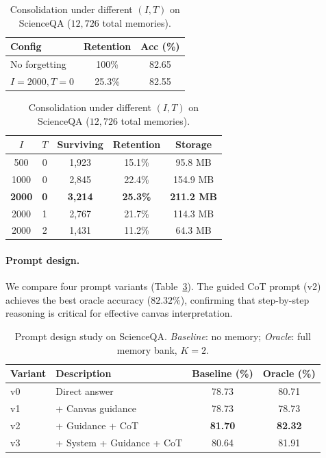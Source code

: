 \documentclass{article}
\begin{document}
\begin{table}[t]
  \centering
  \begin{minipage}[t]{0.38\textwidth}
    \centering
    \caption{Effect of memory consolidation on ScienceQA.}
    \label{tab:consolidation}
    \begin{tabular}{@{}lcc@{}}
      \toprule
      Config & Retention & Acc (\%) \\
      \midrule
      No forgetting & 100\% & 82.65 \\
      $I\!=\!2000, T\!=\!0$ & 25.3\% & 82.55 \\
      \bottomrule
    \end{tabular}
  \end{minipage}
  \hfill
  \begin{minipage}[t]{0.58\textwidth}
    \centering
    \caption{Consolidation under different $(I, T)$ on ScienceQA ($12{,}726$ total memories).}
    \label{tab:forgetting_configs}
    \begin{tabular}{@{}ccccc@{}}
      \toprule
      $I$ & $T$ & Surviving & Retention & Storage \\
      \midrule
      500 & 0 & 1,923 & 15.1\% & 95.8 MB \\
      1000 & 0 & 2,845 & 22.4\% & 154.9 MB \\
      \textbf{2000} & \textbf{0} & \textbf{3,214} & \textbf{25.3\%} & \textbf{211.2 MB} \\
      2000 & 1 & 2,767 & 21.7\% & 114.3 MB \\
      2000 & 2 & 1,431 & 11.2\% & 64.3 MB \\
      \bottomrule
    \end{tabular}
  \end{minipage}
\end{table}

\paragraph{Prompt design.}
We compare four prompt variants (Table~\ref{tab:prompt}). The guided CoT prompt (v2) achieves the best oracle accuracy ($82.32\%$), confirming that step-by-step reasoning is critical for effective canvas interpretation.

\begin{table}[t]
  \centering
  \caption{Prompt design study on ScienceQA. \emph{Baseline}: no memory; \emph{Oracle}: full memory bank, $K\!=\!2$.}
  \label{tab:prompt}
  \begin{tabular}{@{}llcc@{}}
    \toprule
    Variant & Description & Baseline (\%) & Oracle (\%) \\
    \midrule
    v0 & Direct answer & 78.73 & 80.71 \\
    v1 & + Canvas guidance & 78.73 & 78.73 \\
    v2 & + Guidance + CoT & \textbf{81.70} & \textbf{82.32} \\
    v3 & + System + Guidance + CoT & 80.64 & 81.91 \\
    \bottomrule
  \end{tabular}
\end{table}
\end{document}
